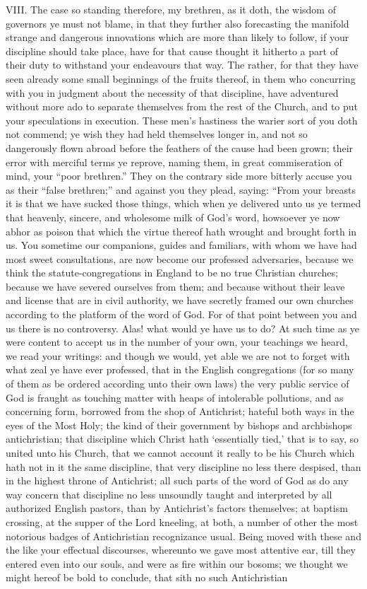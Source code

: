 VIII. The case so standing therefore, my brethren, as it doth, the wisdom of governors ye must not blame, in that they further also forecasting the manifold strange and dangerous innovations which are more than likely to follow, if your discipline should take place, have for that cause thought it hitherto a part of their duty to withstand your endeavours that way. The rather, for that they have seen already some small beginnings of the fruits thereof, in them who concurring with you in judgment about the necessity of that discipline, have adventured without more ado to separate themselves from the rest of the Church, and to put your speculations in execution. These men’s hastiness the warier sort of you doth not commend; ye wish they had held themselves longer in, and not so dangerously flown abroad before the feathers of the cause had been grown; their error with merciful terms ye reprove, naming them, in great commiseration of mind, your “poor brethren.” They on the contrary side more bitterly accuse you as their “false brethren;” and against you they plead, saying: “From your breasts it is that we have sucked those things, which when ye delivered unto us ye termed that heavenly, sincere, and wholesome milk of God’s word, howsoever ye now abhor as poison that which the virtue thereof hath wrought and brought forth in us. You sometime our companions, guides and familiars, with whom we have had most sweet consultations, are now become our professed adversaries, because we think the statute-congregations in England to be no true Christian churches; because we have severed ourselves from them; and because without their leave and license that are in civil authority, we have secretly framed our own churches according to the platform of the word of God. For of that point between you and us there is no controversy. Alas! what would ye have us to do? At such time as ye were content to accept us in the number of your own, your teachings we heard, we read your writings: and though we would, yet able we are not to forget with what zeal ye have ever professed, that in the English congregations (for so many of them as be ordered according unto their own laws) the very public service of God is fraught as touching matter with heaps of intolerable pollutions, and as concerning form, borrowed from the shop of Antichrist; hateful both ways in the eyes of the Most Holy; the kind of their government by bishops and archbishops antichristian; that discipline which Christ hath ‘essentially tied,’ that is to say, so united unto his Church, that we cannot account it really to be his Church which hath not in it the same discipline, that very discipline no less there despised, than in the highest throne of Antichrist; all such parts of the word of God as do any way concern that discipline no less unsoundly taught and interpreted by all authorized English pastors, than by Antichrist’s factors themselves; at baptism crossing, at the supper of the Lord kneeling, at both, a number of other the most notorious badges of Antichristian recognizance usual. Being moved with these and the like your effectual discourses, whereunto we gave most attentive ear, till they entered even into our souls, and were as fire within our bosoms; we thought we might hereof be bold to conclude, that sith no such Antichristian 